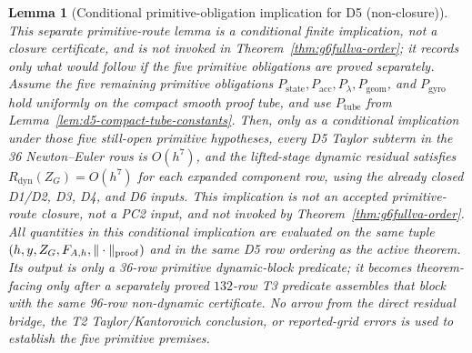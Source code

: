 \documentclass[preprint,12pt]{elsarticle}
\newtheorem{lemma}{Lemma}
\begin{document}
\begin{lemma}[Conditional primitive-obligation implication for D5 (non-closure)]
\label{lem:d5-primitive-obligation-implication}
This separate primitive-route lemma is a conditional finite implication, not
a closure certificate, and is not invoked in
Theorem~\ref{thm:g6fullva-order}; it records only what would follow if the
five primitive obligations are proved separately.
Assume the five remaining primitive obligations
\(P_{\mathrm{state}},P_{\mathrm{acc}},P_{\lambda},P_{\mathrm{geom}}\), and
\(P_{\mathrm{gyro}}\) hold uniformly on the compact smooth proof tube, and use
\(P_{\mathrm{tube}}\) from Lemma~\ref{lem:d5-compact-tube-constants}.  Then,
only as a conditional implication under those five still-open primitive
hypotheses, every D5 Taylor subterm in the 36 Newton--Euler rows is
\(O(h^7)\), and the lifted-stage dynamic residual satisfies
\(R_{\mathrm{dyn}}(Z_G)=O(h^7)\) for each expanded component row, using the
already closed D1/D2, D3, D4, and D6 inputs.  This implication is not an
accepted primitive-route closure, not a PC2 input, and not invoked by
Theorem~\ref{thm:g6fullva-order}.
All quantities in this conditional implication are evaluated on the same
tuple \((h,y,Z_G,F_{A,h},\|\cdot\|_{\rm proof})\) and in the same D5 row
ordering as the active theorem.  Its output is only a 36-row primitive
dynamic-block predicate; it becomes theorem-facing only after a separately
proved \(132\)-row T3 predicate assembles that block with the same 96-row
non-dynamic certificate.  No arrow from the direct residual bridge, the T2
Taylor/Kantorovich conclusion, or reported-grid errors is used to establish
the five primitive premises.
\end{lemma}
\end{document}
